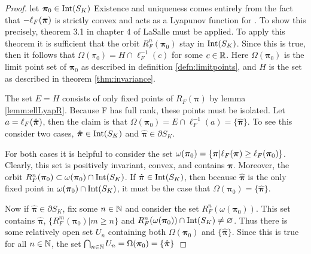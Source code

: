 \begin{proof}
	let \( \bm\pi_0\in\op{Int}(S_K)  \)
	Existence and uniqueness comes entirely from the fact that \( -\elpi{F} \) is strictly convex and acts as a Lyapunov function for . To show this precisely, theorem 3.1 in chapter 4 of LaSalle \cite{lasalle1976dynsys} must be applied. To apply this theorem it is sufficient that the orbit \( R_F^n(\bm\pi_0) \) stay in \(\op{Int}(S_K)\). Since this is true, then it follows that \( \Omega(\pi_0) = H\cap \ell_{F}^{-1}(c) \) for some \( c\in \R \).	Here \( \Omega(\bm\pi_0) \) is the limit point set of \( \bm\pi_0 \) as described in definition \ref{defn:limitpoints}, and \( H \) is the set as described in theorem \ref{thm:invariance}.
	
	The set \( E=H \) consists of only fixed points of \( R_{F}(\bm\pi) \) by lemma \ref{lemm:ellLyapR}. Because F has full rank, these points must be isolated. Let \( a=\elpi[\hat{\bm \pi}]{F} \), then the claim is that \( \Omega(\bm\pi_0) =E\cap\ell_{F}^{-1}(a)= \{\hat{\bm\pi}\}. \) To see this consider two cases, \( \hat{\bm \pi}\in \op{Int}(S_K) \) and \( \hat{\bm \pi}\in \partial S_K \). 
	
    For both cases it is helpful to consider the set \(\omega(\bm\pi_0) = \{\bm\pi|\elpi{F}\geq\ell_{F}(\bm\pi_0)\}\). Clearly, this set is positively invariant, convex, and contains \( \hat{\bm \pi}. \)  Moreover, the orbit \( R_F^n(\bm\pi_0) \subset \omega(\bm\pi_0)\cap \op{Int}(S_K)\). If \( \hat{\bm \pi}\in \op{Int}(S_K) \), then because \( \hat{\bm\pi} \)  is the only fixed point in \( \omega(\bm\pi_0)\cap \op{Int}(S_K) \), it must be the case that \( \Omega(\bm\pi_0) = \{\hat{\bm\pi}\} \).
    
    Now if \( \hat{\bm \pi}\in \partial S_K \), fix some \( n\in\N \) and consider the set \( R_F^n(\omega(\bm\pi_0)). \) This set contains \( \hat{\bm \pi} \), \( \{R_F^m(\bm\pi_0)|m\geq n\} \) and \( R_F^n(\omega(\bm\pi_0))\cap\op{Int}(S_K)\neq\varnothing \). Thus there is some relatively open set \( U_n \) containing both \( \Omega(\bm\pi_0) \) and \( \{\hat{\bm\pi}\} \). Since this is true for all \( n\in\N \), the set \( \bigcap_{n\in\N}U_n = \Omega(\bm\pi_0)=\{\hat{\bm\pi}\} \)	
\end{proof}

